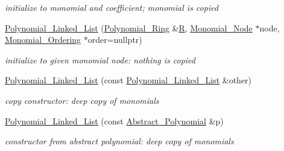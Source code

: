 \begin{Indent}
\begin{DoxyCompactItemize}
\begin{DoxyCompactList}\small\item\em initialize to monomial and coefficient; monomial is copied \end{DoxyCompactList}\item 
\mbox{\label{class_polynomial___linked___list_a04b262259525309fcb0fe79fa7e696a3}} 
\hyperlink{class_polynomial___linked___list_a04b262259525309fcb0fe79fa7e696a3}{Polynomial\+\_\+\+Linked\+\_\+\+List} (\hyperlink{class_polynomial___ring}{Polynomial\+\_\+\+Ring} \&\hyperlink{class_abstract___polynomial_a551ade20b7dcd96c227dd0401f6ffbbe}{R}, \hyperlink{class_monomial___node}{Monomial\+\_\+\+Node} $\ast$node, \hyperlink{class_monomial___ordering}{Monomial\+\_\+\+Ordering} $\ast$order=nullptr)
\begin{DoxyCompactList}\small\item\em initialize to given monomial node\+: nothing is copied \end{DoxyCompactList}\item 
\mbox{\label{class_polynomial___linked___list_abd37d81f9f973f93d380425882b0b7d6}} 
\hyperlink{class_polynomial___linked___list_abd37d81f9f973f93d380425882b0b7d6}{Polynomial\+\_\+\+Linked\+\_\+\+List} (const \hyperlink{class_polynomial___linked___list}{Polynomial\+\_\+\+Linked\+\_\+\+List} \&other)
\begin{DoxyCompactList}\small\item\em copy constructor\+: deep copy of monomials \end{DoxyCompactList}\item 
\mbox{\label{class_polynomial___linked___list_a347fda55f27fa10327c9854913d416ce}} 
\hyperlink{class_polynomial___linked___list_a347fda55f27fa10327c9854913d416ce}{Polynomial\+\_\+\+Linked\+\_\+\+List} (const \hyperlink{class_abstract___polynomial}{Abstract\+\_\+\+Polynomial} \&p)
\begin{DoxyCompactList}\small\item\em constructor from abstract polynomial\+: deep copy of monomials \end{DoxyCompactList}\end{DoxyCompactItemize}
\end{Indent}
